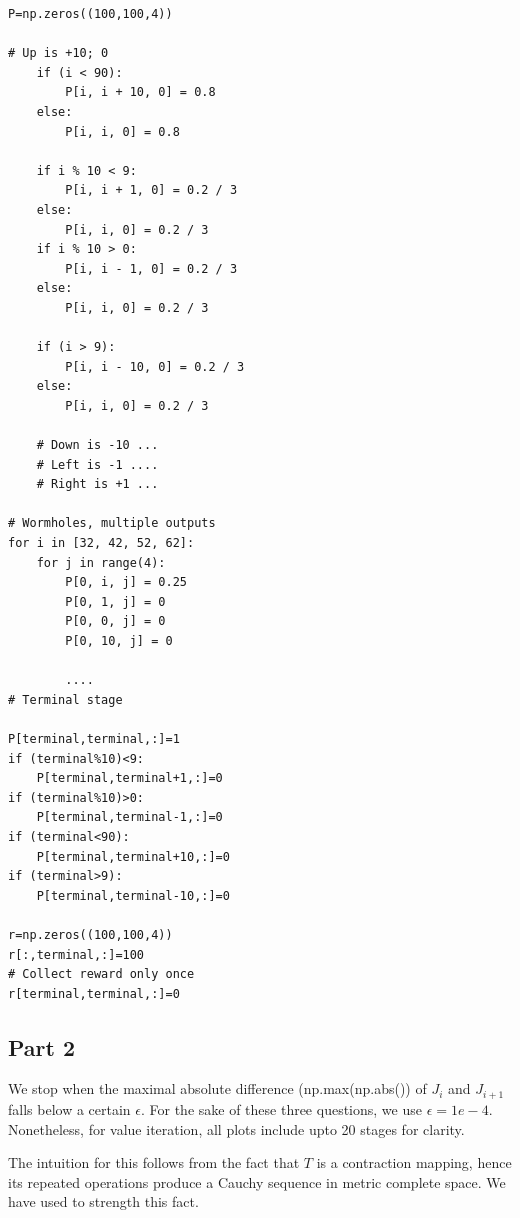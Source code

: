 \begin{lstlisting}
P=np.zeros((100,100,4))

# Up is +10; 0
    if (i < 90):
        P[i, i + 10, 0] = 0.8
    else:
        P[i, i, 0] = 0.8

    if i % 10 < 9:
        P[i, i + 1, 0] = 0.2 / 3
    else:
        P[i, i, 0] = 0.2 / 3
    if i % 10 > 0:
        P[i, i - 1, 0] = 0.2 / 3
    else:
        P[i, i, 0] = 0.2 / 3

    if (i > 9):
        P[i, i - 10, 0] = 0.2 / 3
    else:
        P[i, i, 0] = 0.2 / 3
        
    # Down is -10 ...
    # Left is -1 ....
    # Right is +1 ...
    
# Wormholes, multiple outputs
for i in [32, 42, 52, 62]:
    for j in range(4):
        P[0, i, j] = 0.25
        P[0, 1, j] = 0
        P[0, 0, j] = 0
        P[0, 10, j] = 0
        
        ....
# Terminal stage

P[terminal,terminal,:]=1
if (terminal%10)<9:
    P[terminal,terminal+1,:]=0
if (terminal%10)>0:
    P[terminal,terminal-1,:]=0
if (terminal<90):
    P[terminal,terminal+10,:]=0
if (terminal>9):
    P[terminal,terminal-10,:]=0

r=np.zeros((100,100,4))
r[:,terminal,:]=100
# Collect reward only once
r[terminal,terminal,:]=0
\end{lstlisting}

\subsection{Part 2}

We stop when the maximal absolute difference (np.max(np.abs()) of $J_i$ and $J_{i+1}$ falls below a certain $\epsilon$. For the sake of these three questions, we use $\epsilon = 1e-4$. \\

Nonetheless, for value iteration, all plots include upto 20 stages for clarity.

The intuition for this follows from the fact that $T$ is a contraction mapping, hence its repeated operations produce a Cauchy sequence in metric complete space. We have used to strength this fact.

